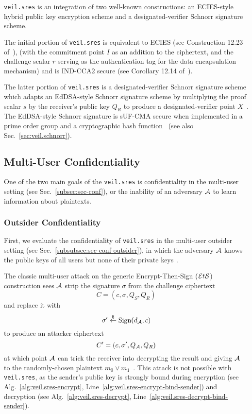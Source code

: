 \texttt{veil.sres} is an integration of two well-known constructions: an ECIES-style hybrid public key encryption scheme
and a designated-verifier Schnorr signature scheme.

The initial portion of \texttt{veil.sres} is equivalent to ECIES (see Construction 12.23 of~\cite[p. 435]{katz2020}),
\@(with the commitment point $I$ as an addition to the ciphertext, and the challenge scalar $r$ serving as the
authentication tag for the data encapsulation mechanism) and is IND-CCA2 secure (see Corollary 12.14
of~\cite[p. 436]{katz2020}).

The latter portion of \texttt{veil.sres} is a designated-verifier Schnorr signature scheme which adapts an EdDSA-style
Schnorr signature scheme by multiplying the proof scalar $s$ by the receiver's public key $Q_R$ to produce a
designated-verifier point $X$~\cite{steinfeld2004}.
The EdDSA-style Schnorr signature is sUF-CMA secure when implemented in a prime order
group and a cryptographic hash function~\cite{brendel2021, chalkias2020, pointcheval2000, neven2009}
(see also Sec.~\ref{sec:veil.schnorr})\@.

\subsection{Multi-User Confidentiality}\label{subsec:veil.sres-conf}

One of the two main goals of the \texttt{veil.sres} is confidentiality in the multi-user setting
(see Sec.~\ref{subsec:sec-conf}), or the inability of an adversary $\mathcal{A}$ to learn information about plaintexts.

\subsubsection{Outsider Confidentiality}

First, we evaluate the confidentiality of \texttt{veil.sres} in the multi-user outsider setting
(see Sec.~\ref{subsubsec:sec-conf-outsider}), in which the adversary $\mathcal{A}$ knows the public keys of all users but
none of their private keys~\cite[p. 44]{baek2010}\@.

The classic multi-user attack on the generic Encrypt-Then-Sign ($\mathcal{E}t\mathcal{S}$) construction sees $\mathcal{A}$ strip the
signature $\sigma$ from the challenge ciphertext
\[
    C=(c,\sigma,Q_S,Q_R)
\]
and replace it with
\[
    \sigma' \stackrel{\$}{\gets} \text{Sign}(d_{\mathcal{A}},c)
\]
to produce an attacker ciphertext
\[
    C'=(c,\sigma',Q_{\mathcal{A}},Q_R)
\]
at which point $\mathcal{A}$ can trick the receiver into decrypting the result and giving $\mathcal{A}$ to the
randomly-chosen plaintext $m_0 \lor m_1$~\cite[p. 40]{an2010}.
This attack is not possible with \texttt{veil.sres}\@, as the sender's public key is strongly bound during
encryption (see Alg.~\ref{alg:veil.sres-encrypt}, Line~\ref{alg:veil.sres-encrypt-bind-sender}) and decryption
(see Alg.~\ref{alg:veil.sres-decrypt}, Line~\ref{alg:veil.sres-decrypt-bind-sender}).

